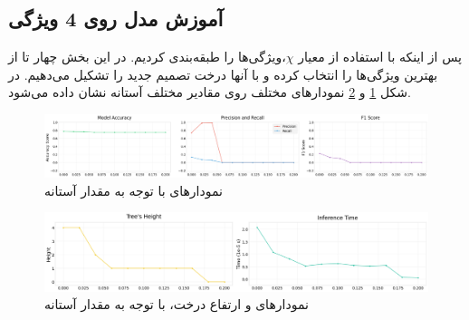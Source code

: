 \documentclass{article}
\begin{document}
	\subsection{آموزش مدل روی 4 ویژگی}
	پس از اینکه با استفاده از معیار $\chi$،‌ویژگی‌ها را طبقه‌بندی کردیم. در این بخش چهار تا از بهترین ویژگی‌ها را انتخاب کرده و با آنها درخت تصمیم جدید را تشکیل می‌دهیم. در شکل 
	\ref{fig: ig 4 train}
	و
	\ref{fig: ig 4 train2}
	نمودار‌های مختلف روی مقادیر مختلف آستانه
	نشان داده می‌شود.
	\begin{figure}[H]
		\centering
		\includegraphics[scale=0.3]{figs/4_feature_train1}
		\caption{
			نمودار‌های 
			با توجه به مقدار آستانه
		}
		\label{fig: ig 4 train}
	\end{figure}
	\begin{figure}[H]
		\centering
		\includegraphics[scale=0.3]{figs/4_feature_train2}
		\caption{
			نمودار‌های 
			و ارتفاع درخت،
			با توجه به مقدار آستانه
		}
		\label{fig: ig 4 train2}
	\end{figure}
\end{document}
